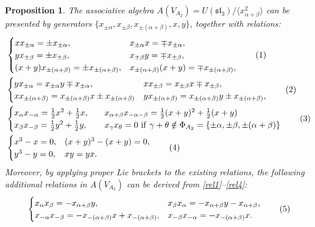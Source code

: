 \documentclass[12pt,a4paper,reqno]{amsart}
\numberwithin{equation}{section}
\numberwithin{equation}{section}
\newtheorem{prop}[thm]{Proposition}
\newcommand\numberthis{\addtocounter{equation}{1}\tag{\theequation}}
\theoremstyle{definition}
\def \al{\alpha}
\def \ga {\gamma}
\def \b {\beta}
\def\<{\langle}
\def\>{\rangle}
\def\sl{\mathfrak{sl}}
\begin{document}
	\begin{prop}\label{prop:presentationofAVA2}
		The associative algebra $A(V_{A_2})=U(\sl_3)/\<x_{\al+\b}^2\>$ can be presented by generators $\{x_{\pm \al}, x_{\pm \b}, x_{\pm(\al+\b)}, x,y\}$, together with relations: 
		\begin{align*}
			&\begin{cases}
				xx_{\pm \al}=\pm x_{\pm \al},&x_{\pm \al}x=\mp x_{\pm \al},\\
				yx_{\pm \b}=\pm x_{\pm\b},& x_{\pm \b} y=\mp x_{\pm \b},\\
				(x+y)x_{\pm (\al+\b)}=\pm x_{\pm (\al+\b)},& x_{\pm (\al+\b)}(x+y)=\mp x_{\pm( \al+\b)},
			\end{cases}\numberthis\label{rel1}\\
			&\begin{cases}
				yx_{\pm \al}=x_{\pm \al}y\mp x_{\pm \al},& xx_{\pm \b}=x_{\pm \b} x\mp x_{\pm \b},\\
				xx_{\pm (\al+\b)}=x_{\pm (\al+\b)}x\pm x_{\pm(\al+\b)}
				& yx_{\pm (\al+\b)}=x_{\pm (\al+\b)}y\pm x_{\pm (\al+\b)},
			\end{cases}\numberthis\label{rel2}\\
			&\begin{cases}
				x_\al x_{-\al}=\frac{1}{2}x^2+\frac{1}{2}x,\quad & x_{\al+\b}x_{-\al-\b}=\frac{1}{2} (x+y)^2+\frac{1}{2}(x+y)\\
				x_\b x_{-\b}=\frac{1}{2}y^2+\frac{1}{2}y,& 	x_\gamma x_\theta=0\ \mathrm{if}\ \ga+\theta\notin \Phi_{A_2}=\{ \pm \al, \pm\b,\pm (\al+\b)\}
			\end{cases}\numberthis\label{rel3} \\
			&\begin{cases}
				x^3-x=0,&  (x+y)^3-(x+y)=0,\\
				y^3-y=0,& xy=yx.
			\end{cases}\numberthis\label{rel4}
		\end{align*}
		Moreover, by applying proper Lie brackets to the existing relations, the following additional relations in $A(V_{A_2})$ can be derived from \eqref{rel1}--\eqref{rel4}: 
		\begin{align*}
			&\begin{cases}
				x_\al x_\b=-x_{\al+\b}y,\ & x_\b x_\al=-x_{\al+\b}y-x_{\al+\b},\\
				x_{-\al}x_{-\b}=-x_{-(\al+\b)}x+x_{-(\al+\b)},&  x_{-\b}x_{-\al}=-x_{-(\al+\b)}x. 
			\end{cases}\numberthis\label{eq:morerel1} \\

\end{align*}
\end{prop}
\end{document}
